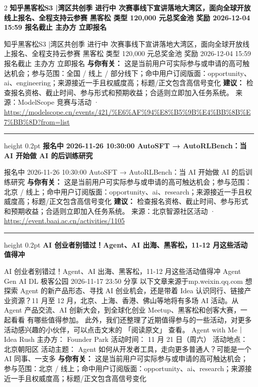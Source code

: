 \documentclass[10.5pt]{ctexart}
\begin{document}
\begin{multicols}{2}
{\large\bfseries 知乎黑客松S3 |湾区共创季 进行中 次赛事线下宣讲落地大湾区，面向全球开放线上报名、全程支持云参赛 黑客松 类型 120,000 元总奖金池 奖励 2026-12-04 15:59 报名截止 主办方 立即报名}\par
知乎黑客松S3 |湾区共创季 进行中 次赛事线下宣讲落地大湾区，面向全球开放线上报名、全程支持云参赛 黑客松 类型 120,000 元总奖金池 奖励 2026-12-04 15:59 报名截止 主办方 立即报名
\textbf{与你有关：} 这是当前用户可实际参与或申请的高可触达机会；参与范围：全国 / 线上 / 部分线下；命中用户订阅版面：opportunity、ai、engineering；来源接近一手且权威度高；标题/正文包含高信号变化
\textbf{建议：} 检查报名资格、截止时间、参与形式和预期收益；合适则立即加入任务系统。
{\footnotesize\color{ormuted} 来源：ModelScope 竞赛与活动 · \url{https://modelscope.cn/events/421/%E6%AF%94%E8%B5%9B%E4%BB%8B%E7%BB%8D?from=list}}
\vspace{2mm}
\hrule height 0.2pt
\vspace{2mm}
{\large\bfseries 报名中 2026-11-26 10:30:00 AutoSFT → AutoRLBench：当 AI 开始做 AI 的后训练研究}\par
报名中 2026-11-26 10:30:00 AutoSFT → AutoRLBench：当 AI 开始做 AI 的后训练研究
\textbf{与你有关：} 这是当前用户可实际参与或申请的高可触达机会；参与范围：北京 / 线上；命中用户订阅版面：opportunity、ai、research；来源接近一手且权威度高；标题/正文包含高信号变化
\textbf{建议：} 检查报名资格、截止时间、参与形式和预期收益；合适则立即加入任务系统。
{\footnotesize\color{ormuted} 来源：北京智源社区活动 · \url{https://event.baai.ac.cn/activities/1105}}
\vspace{2mm}
\hrule height 0.2pt
\vspace{2mm}
{\large\bfseries AI 创业者别错过！Agent、AI 出海、黑客松，11-12 月这些活动值得冲}\par
AI 创业者别错过！Agent、AI 出海、黑客松，11-12 月这些活动值得冲 Agent Gen AI DL 极客公园 2026-11-17 23:50 分享 以下文章来源于mp.weixin.qq.com 想探索 Agent 的新产品形态、寻找 AI 创业机会，还是带着 Idea 认识同行、链接产业资源？11 月至 12 月，北京、上海、香港、佛山等地将有多场 AI 活动。从 Agent 产品交流、AI 创新大会，到全球化创业 Meetup、黑客松和创客大赛，一起看看 有哪些值得参加。 此外，我们还整理了近期值得参与的一些活动，对更多活动感兴趣的小伙伴，可以点击文末的 「阅读原文」 查看。 Agent with Me｜Idea Rush 主办方： Founder Park 活动时间： 11 月 21 日（周六） 活动地点： 北京朝阳区 活动主题： Agent 如何从开发者工具，走向更多普通人？可能是一个 AI 同事、一支多
\textbf{与你有关：} 这是当前用户可实际参与或申请的高可触达机会；参与范围：北京 / 线上；命中用户订阅版面：opportunity、ai、research；来源接近一手且权威度高；标题/正文包含高信号变化

\end{multicols}
\end{document}
